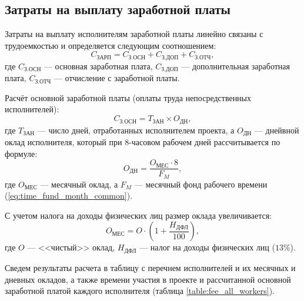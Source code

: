 \subsection{Затраты на выплату заработной платы} \label{salary}

Затраты на выплату исполнителям заработной платы линейно связаны с трудоемкостью и определяется следующим соотношением:
\begin{equation}
  \label{eq:salary}
C_\textrm{ЗАРП} = C_\textrm{З.ОСН} + C_\textrm{З.ДОП} + C_\textrm{З.ОТЧ},
\end{equation}
где $C_\textrm{З.ОСН}$ --- основная заработная плата, $C_\textrm{З.ДОП}$ --- дополнительная заработная плата, $C_\textrm{З.ОТЧ}$ --- отчисление с заработной платы.

\vspace{\baselineskip}
Расчёт основной заработной платы (оплаты труда непосредственных исполнителей):
\begin{equation}
  \label{eq:salary_counting}
C_\textrm{З.ОСН} = T_\textrm{ЗАН} \times O_\textrm{ДН},
\end{equation}
где $T_\textrm{ЗАН}$ --- число дней, отработанных исполнителем проекта, а $O_\textrm{ДН}$ --- днейвной оклад исполнителя, который при 8-часовом рабочем дней рассчитывается по формуле:
\begin{equation}
  \label{eq:worker_fee}
O_\textrm{ДН} = \frac {O_\textrm{МЕС} \cdot 8} {F_M},
\end{equation}
где $O_\textrm{МЕС}$ --- месячный оклад, а $F_M$ --- месячный фонд рабочего времени (\ref{eq:time_fund_month_common}).

\vspace{\baselineskip}
С учетом налога на доходы физических лиц размер оклада увеличивается:
\begin{equation}
  \label{eq:worker_fee_with_taxes}
O_\textrm{МЕС} = O \cdot (1 + \frac {H_\textrm{ДФЛ}} {100}),
\end{equation}
где $O$ --- <<чистый>> оклад, $H_\textrm{ДФЛ}$ --- налог на доходы физических лиц ($13\%$).

\vspace{\baselineskip}
Сведем результаты расчета в таблицу с перечнем исполнителей и их месячных и дневных окладов, а также времени участия в проекте и рассчитанной основной заработной платой каждого исполнителя (таблица \ref{table:fee_all_workers}).

